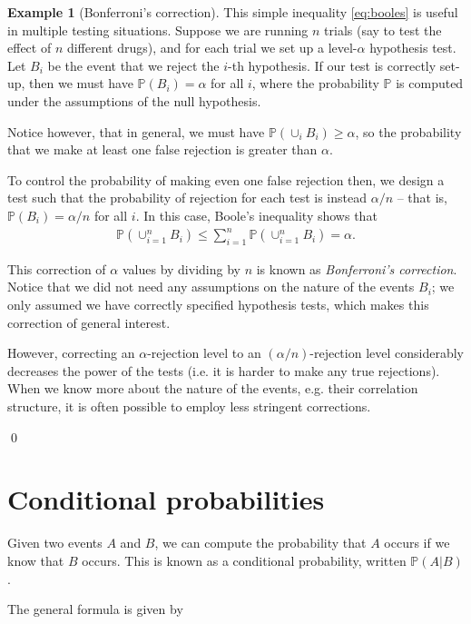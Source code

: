 \documentclass[11pt]{article}
\theoremstyle{definition}
\newtheorem{example}[theorem]{Example}
\renewcommand{\P}{\mathbb{P}}
\begin{document}
\begin{example}[Bonferroni's correction]
This simple inequality \eqref{eq:booles} is useful in multiple testing situations.
Suppose we are running $n$ trials (say to test the effect of $n$ different drugs),
and for each trial we set up a level-$\alpha$
hypothesis test.
Let $B_i$ be the event that we reject the $i$-th hypothesis.
If our test is correctly set-up, then we must have $\P(B_i) = \alpha$ for all $i$,
where the probability $\P$ is computed under the assumptions of the null hypothesis.

Notice however, that in general, we must have $\P(\cup_i B_i) \geq \alpha$,
so the probability that we make at least one false rejection is greater than $\alpha$.

To control the probability of making even one false rejection then, we design
a test such that the probability of rejection for each test is instead $\alpha / n$ --
that is, $\P(B_i) = \alpha / n$ for all $i$. In this case,
Boole's inequality shows that
\begin{align*}
  \P(\cup_{i=1}^n B_i) \leq \sum_{i=1}^{n} \P(\cup_{i = 1}^n B_i)
  = \alpha.
\end{align*}

This correction of $\alpha$ values by dividing by $n$ is known as \textit{Bonferroni's correction}.
Notice that we did not need any assumptions on the nature of the events $B_i$;
we only assumed we have correctly specified hypothesis tests, which makes this
correction of general interest.

However, correcting an $\alpha$-rejection level to an $(\alpha / n)$-rejection level
considerably decreases the power of the tests (i.e. it is harder to make any true rejections).
When we know more about the nature of the events, e.g. their correlation structure,
it is often possible to employ less stringent corrections.

\qed
\end{example}

\section{Conditional probabilities}

Given two events $A$ and $B$, we can compute the probability that $A$ occurs
if we know that $B$ occurs. This is known as a conditional probability,
written $\P(A | B)$.

The general formula is given by

\fbox{\begin{minipage}{\textwidth}
\vspace{-1em}
\begin{align}
  \P(A | B) = \frac{\P(A \cap B)}{\P(B)}.
  \label{eq:conditional_prob}
\end{align}
\end{minipage}}
\end{document}
